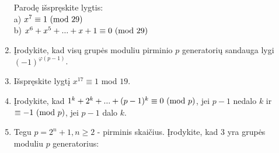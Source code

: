 \begin{enumerate}
    Parodę išspręskite lygtis: \\
      a) $x^7 \equiv 1 \ (\text{mod } 29)$\\
      b) $x^6 + x^5 + ... + x + 1 \equiv 0 \ (\text{mod } 29)$
  \item Įrodykite, kad visų grupės moduliu pirminio $p$ generatorių sandauga lygi
    $(-1)^{\varphi(p-1)}$.
  \item Išspręskite lygtį $x^{17} \equiv 1$ mod $19$. 
  \item Įrodykite, kad $1^k + 2^k + ... + (p-1)^k \equiv 0 \ (\text{mod } p)$, jei
    $p-1$ nedalo $k$ ir $\equiv - 1 \ (\text{mod } p)$, jei $p-1$ dalo $k$.
  \item Tegu $p = 2^n + 1, n \geq 2$ - pirminis skaičius. Įrodykite, kad $3$ yra grupės
    moduliu $p$ generatorius: \\

\end{enumerate}
